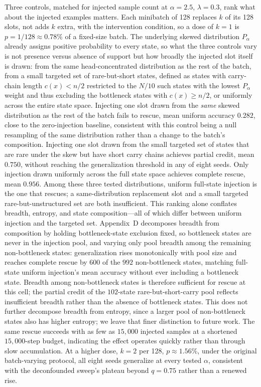 \documentclass[11pt]{article}
\begin{document}
Three controls, matched for injected sample count at $\alpha=2.5$, $\lambda=0.3$, rank what about the injected examples matters. Each minibatch of 128 replaces $k$ of its 128 slots, not adds $k$ extra, with the intervention condition, so a dose of $k=1$ is $p=1/128\approx0.78\%$ of a fixed-size batch. The underlying skewed distribution $P_\alpha$ already assigns positive probability to every state, so what the three controls vary is not presence versus absence of support but how broadly the injected slot itself is drawn: from the same head-concentrated distribution as the rest of the batch, from a small targeted set of rare-but-short states, defined as states with carry-chain length $c(x)<n/2$ restricted to the $N/10$ such states with the lowest $P_\alpha$ weight and thus excluding the bottleneck states with $c(x)\ge n/2$, or uniformly across the entire state space. Injecting one slot drawn from the \emph{same} skewed distribution as the rest of the batch fails to rescue, mean uniform accuracy $0.282$, close to the zero-injection baseline, consistent with this control being a null resampling of the same distribution rather than a change to the batch's composition. Injecting one slot drawn from the small targeted set of states that are rare under the skew but have short carry chains achieves partial credit, mean $0.750$, without reaching the generalization threshold in any of eight seeds. Only injection drawn uniformly across the full state space achieves complete rescue, mean $0.956$. Among these three tested distributions, uniform full-state injection is the one that rescues; a same-distribution replacement slot and a small targeted rare-but-unstructured set are both insufficient. This ranking alone conflates breadth, entropy, and state composition---all of which differ between uniform injection and the targeted set. Appendix~D decomposes breadth from composition by holding bottleneck-state exclusion fixed, so bottleneck states are never in the injection pool, and varying only pool breadth among the remaining non-bottleneck states: generalization rises monotonically with pool size and reaches complete rescue by $600$ of the $992$ non-bottleneck states, matching full-state uniform injection's mean accuracy without ever including a bottleneck state. Breadth among non-bottleneck states is therefore sufficient for rescue at this cell; the partial credit of the $102$-state rare-but-short-carry pool reflects insufficient breadth rather than the absence of bottleneck states. This does not further decompose breadth from entropy, since a larger pool of non-bottleneck states also has higher entropy; we leave that finer distinction to future work. The same rescue succeeds with as few as $15{,}000$ injected samples at a shortened $15{,}000$-step budget, indicating the effect operates quickly rather than through slow accumulation. At a higher dose, $k=2$ per 128, $p{\approx}1.56\%$, under the original batch-varying protocol, all eight seeds generalize at every tested $\alpha$, consistent with the deconfounded sweep's plateau beyond $q=0.75$ rather than a renewed rise.
\end{document}
